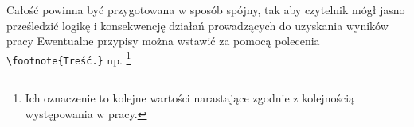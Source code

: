 Całość powinna być przygotowana w sposób spójny, tak aby czytelnik mógł jasno prześledzić logikę i konsekwencję działań prowadzących do uzyskania wyników pracy
Ewentualne przypisy można wstawić za pomocą polecenia \verb|\footnote{Treść.}| np. \footnote{Ich oznaczenie to kolejne wartości narastające zgodnie z kolejnością występowania w pracy.}
